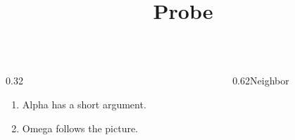 \documentclass[20pt,aspectratio=43]{beamer}
\title{Probe}
\date{}
\begin{document}
\begin{frame}\begin{columns}[onlytextwidth,b]\begin{column}{0.32\textwidth}\begin{enumerate}\item<1-> Alpha has a short argument.\item<2-> \par Omega follows the picture.\end{enumerate}\end{column}\begin{column}{0.62\textwidth}Neighbor\end{column}\end{columns}\end{frame}
\end{document}
